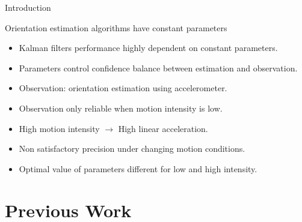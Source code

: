 \documentclass[10pt,aspectratio=1610]{beamer}
\begin{document}
\begin{frame}{Introduction}{}
\begin{block}{Orientation estimation algorithms have constant parameters}
\begin{itemize}
	\item<1-> Kalman filters performance highly dependent on constant parameters.
	\item<2-> Parameters control confidence balance between estimation and observation.
	\item<3-> Observation: orientation estimation using accelerometer.
	\item<4-> Observation only reliable when motion intensity is low.
	\item<5-> High motion intensity $\rightarrow$ High linear acceleration.
	\item<6-> Non satisfactory precision under changing motion conditions.
	\item<7-> Optimal value of parameters different for low and high intensity.
\end{itemize}
\end{block}
\end{frame}

\section{Previous Work}
\label{sec:previous_work}
\end{document}
